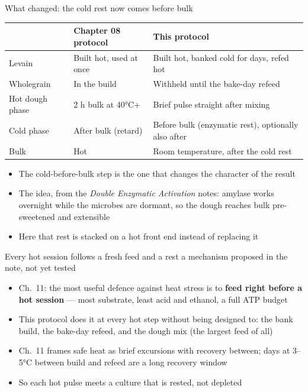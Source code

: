 \documentclass[aspectratio=169,11pt]{beamer}
\newcommand{\hypline}{{\small\hypothesis{} {\color{muted}a mechanism proposed in the note, not yet tested}}\par\smallskip}
\newcommand{\tablesetup}{\renewcommand{\arraystretch}{1.2}\setlength{\tabcolsep}{4pt}}
\newenvironment{tablebox}[1][\footnotesize]{\par\tablesetup#1}{\par}
\begin{document}
\begin{frame}{What changed: the cold rest now comes before bulk}
  \begin{tablebox}
  \begin{tabularx}{\linewidth}{@{}L{2.6cm}YY@{}}
    \toprule
    & \textbf{Chapter 08 protocol} & \textbf{This protocol} \\
    \midrule
    Levain & Built hot, used at once & Built hot, banked cold for days, refed hot \\
    Wholegrain & In the build & Withheld until the bake-day refeed \\
    Hot dough phase & 2 h bulk at 40°C+ & Brief pulse straight after mixing \\
    Cold phase & After bulk (retard) & Before bulk (enzymatic rest), optionally also after \\
    Bulk & Hot & Room temperature, after the cold rest \\
    \bottomrule
  \end{tabularx}
  \end{tablebox}
  \begin{itemize}\small
    \item The cold-before-bulk step is the one that changes the character of the result \ownresult
    \item The idea, from the \textit{Double Enzymatic Activation} notes: amylase works overnight while
      the microbes are dormant, so the dough reaches bulk pre-sweetened and extensible
    \item Here that rest is stacked on a hot front end instead of replacing it
  \end{itemize}
\end{frame}

\begin{frame}{Every hot session follows a fresh feed and a rest}
  \hypline
  \begin{itemize}
    \item Ch.~11: the most useful defence against heat stress is to \textbf{feed right before a hot
      session} --- most substrate, least acid and ethanol, a full ATP budget
    \item This protocol does it at every hot step without being designed to: the bank build, the
      bake-day refeed, and the dough mix (the largest feed of all)
    \item Ch.~11 frames safe heat as brief excursions with recovery between; days at 3--5°C between
      build and refeed are a long recovery window
    \item So each hot pulse meets a culture that is rested, not depleted
  \end{itemize}
\end{frame}
\end{document}
